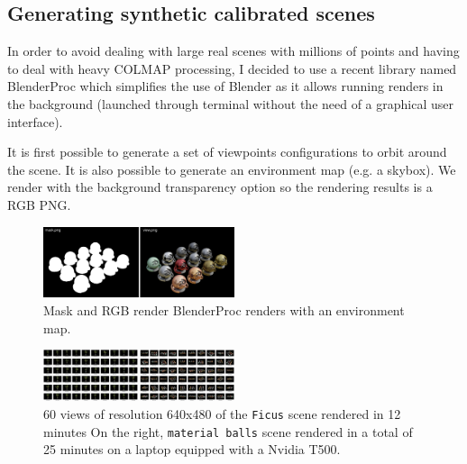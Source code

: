 


\subsection{Generating synthetic calibrated scenes}
\label{sec:synthetic_calibrated_scenes}
In order to avoid dealing with large real scenes with millions of points and having to deal with heavy COLMAP processing, I decided to use a recent library named BlenderProc  \cite{Denninger2023} which simplifies the use of Blender as it allows running renders in the background (launched through terminal without the need of a graphical user interface).

It is first possible to generate a set of viewpoints configurations to orbit around the scene. It is also possible to generate an environment map (e.g. a skybox). We render with the background transparency option so the rendering results is a RGB PNG. 

\begin{figure}[H]
    \centering
    \includegraphics[width=0.5\textwidth]{figures/blenderproc_renders.png}
    \caption{Mask and RGB render BlenderProc renders with an environment map.}
    \label{fig:blenderproc_renders}
\end{figure}

\begin{figure}[H]
    \centering
    \includegraphics[width=0.5\textwidth]{figures/ficus_and_matballs.png}
    \caption{60 views of resolution 640x480 of the \texttt{Ficus} scene rendered in 12 minutes On the right, \texttt{material balls} scene rendered in a total of 25 minutes on a laptop equipped with a Nvidia T500.}
    \label{fig:multiview}
\end{figure}


